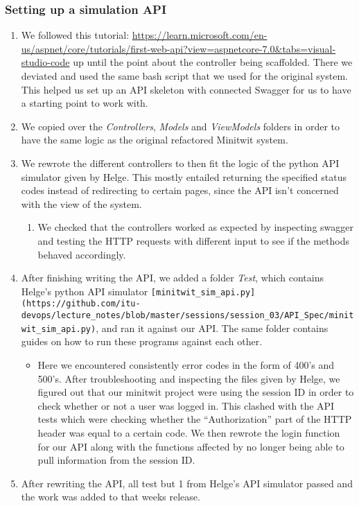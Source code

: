\subsubsection{Setting up a simulation
API}
\label{log:setting-up-a-simulation-api}

\begin{enumerate}
    \item We followed this tutorial: \url{https://learn.microsoft.com/en-us/aspnet/core/tutorials/first-web-api?view=aspnetcore-7.0\&tabs=visual-studio-code} up until the point about the controller being scaffolded. There we deviated and used the same bash script that we used for the original system. This helped us set up an API skeleton with connected Swagger for us to have a starting point to work with.
    \item We copied over the \emph{Controllers}, \emph{Models} and \emph{ViewModels} folders in order to have the same logic as the original refactored Minitwit system.
    \item We rewrote the different controllers to then fit the logic of the python API simulator given by Helge. This mostly entailed returning the specified status codes instead of redirecting to certain pages, since the API isn't concerned with the view of the system.

    \begin{enumerate}
        \item We checked that the controllers worked as expected by inspecting swagger and testing the HTTP requests with different input to see if the methods behaved accordingly.
    \end{enumerate}
    \item After finishing writing the API, we added a folder \emph{Test}, which contains Helge's python API simulator \texttt{{[}minitwit\_sim\_api.py{]}(https://github.com/itu-devops/lecture\_notes/blob/master/sessions/session\_03/API\_Spec/minitwit\_sim\_api.py)}, and ran it against our API. The same folder contains guides on how to run these programs against each other.

    \begin{itemize}
        \item Here we encountered consistently error codes in the form of 400's and 500's. After troubleshooting and inspecting the files given by Helge, we figured out that our minitwit project were using the session ID in order to check whether or not a user was logged in. This clashed with the API tests which were checking whether the ``Authorization'' part of the HTTP header was equal to a certain code. We then rewrote the login function for our API along with the functions affected by no longer being able to pull information from the session ID.
    \end{itemize}

    \item After rewriting the API, all test but 1 from Helge's API simulator passed and the work was added to that weeks release.
\end{enumerate}

